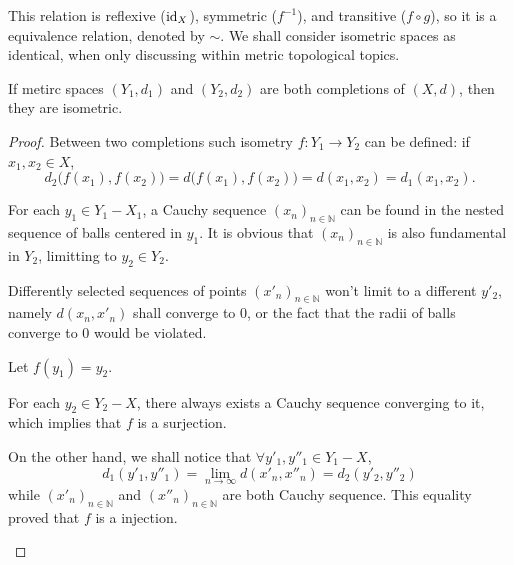 \documentclass[openany]{book}
\begin{document}
This relation is reflexive ($\operatorname{id}_X$), symmetric ($f^{-1}$), and transitive ($f \circ g$), so it is a equivalence relation, denoted by $\sim$. 
We shall consider isometric spaces as identical, when only discussing within metric topological topics.

\begin{theorem}\label{theorem: completion is unique}
	If metirc spaces $(Y_1, d_1)$ and $(Y_2, d_2)$ are both completions of $(X, d)$, then they are isometric.
\end{theorem}
\begin{proof}
	Between two completions such isometry $f \colon Y_1 \to Y_2$ can be defined: if $x_1, x_2 \in X$, 
	\[
		d_2 \big(f(x_1), f(x_2) \big)
		= d \big(f(x_1), f(x_2) \big) 
		= d(x_1, x_2)
		= d_1 (x_1, x_2).
	\]

	For each $y_1 \in Y_1 - X_1$, a Cauchy sequence $(x_n)_{n \in \mathbb N}$ can be found in the nested sequence of balls centered in $y_1$. 
	It is obvious that $(x_n)_{n \in \mathbb N}$ is also fundamental in $Y_2$, limitting to $y_2\in Y_2$. 
	
	Differently selected sequences of points $(x'_n)_{n \in \mathbb N}$ won't limit to a different $y'_2$, namely $d(x_n, x'_n)$ shall converge to $0$, or the fact that the radii of balls converge to $0$ would be violated. 
	
	Let $f(y_1) = y_2$. 

	\begin{conditionlist}[label=\alph*)]
		\item
		For each $y_2 \in Y_2 - X$, there always exists a Cauchy sequence converging to it, which implies that $f$ is a surjection.
		\item
		On the other hand, we shall notice that $\forall y'_1, y''_1 \in Y_1 - X$,
		\[
			d_1(y'_1, y''_1)= \lim_{n \to \infty} d(x'_n, x''_n)=d_2(y'_2, y''_2)
		\]
		while $(x'_n)_{n \in \mathbb N}$ and $(x''_n)_{n \in \mathbb N}$ are both Cauchy sequence. 
		This equality proved that $f$ is a injection.
	\end{conditionlist}
\end{proof}
\end{document}
